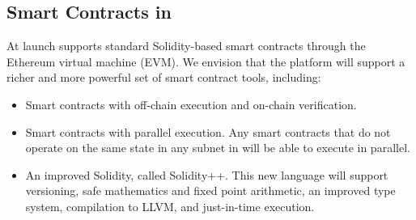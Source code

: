 \documentclass[runningheads]{llncs}
\begin{document}

\subsection{Smart Contracts in \AVATokenName}
At launch \AVAPlatformName{} supports standard Solidity-based smart contracts through the Ethereum virtual machine (EVM). We envision that the platform will support a richer and more powerful set of smart contract tools, including:
\begin{itemize}
\item Smart contracts with off-chain execution and on-chain verification.
\item Smart contracts with parallel execution. Any smart contracts that do not operate on the same state in any subnet in \AVAPlatformName{} will be able to execute in parallel.
\item An improved Solidity, called Solidity++. This new language will support versioning, safe mathematics and fixed point arithmetic, an improved type system, compilation to LLVM, and just-in-time execution. 
\end{itemize}

\end{document}
